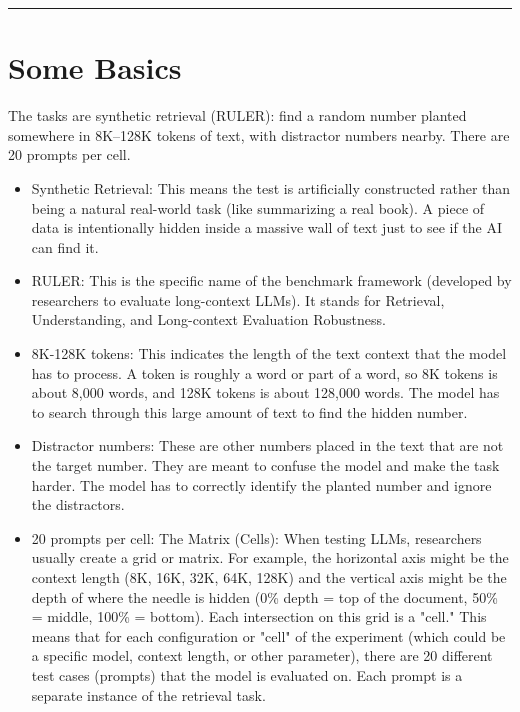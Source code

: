 \tableofcontents
\vspace{1em}
\hrule
\vspace{1em}

\section{Some Basics}

The tasks are synthetic retrieval (RULER): find a random number planted somewhere in 8K–128K tokens of text, with distractor numbers nearby. There are 20 prompts per cell.
\begin{itemize}
    \item Synthetic Retrieval: This means the test is artificially constructed rather than being a natural real-world task (like summarizing a real book). A piece of data is intentionally hidden inside a massive wall of text just to see if the AI can find it. 
    \item RULER: This is the specific name of the benchmark framework (developed by researchers to evaluate long-context LLMs). It stands for Retrieval, Understanding, and Long-context Evaluation Robustness.
    \item 8K-128K tokens: This indicates the length of the text context that the model has to process. A token is roughly a word or part of a word, so 8K tokens is about 8,000 words, and 128K tokens is about 128,000 words. The model has to search through this large amount of text to find the hidden number.
    \item Distractor numbers: These are other numbers placed in the text that are not the target number. They are meant to confuse the model and make the task harder. The model has to correctly identify the planted number and ignore the distractors.
    \item 20 prompts per cell: The Matrix (Cells): When testing LLMs, researchers usually create a grid or matrix. For example, the horizontal axis might be the context length (8K, 16K, 32K, 64K, 128K) and the vertical axis might be the depth of where the needle is hidden (0\% depth = top of the document, 50\% = middle, 100\% = bottom). Each intersection on this grid is a "cell." This means that for each configuration or "cell" of the experiment (which could be a specific model, context length, or other parameter), there are 20 different test cases (prompts) that the model is evaluated on. Each prompt is a separate instance of the retrieval task. 
\end{itemize}

